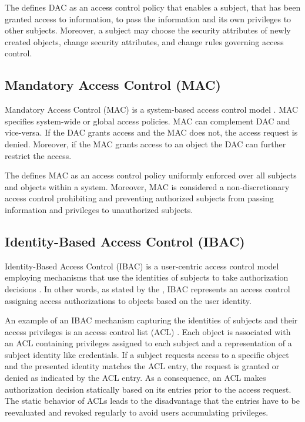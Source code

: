 The \citeauthor{JTF2020} \cite{JTF2020} defines DAC as an access control policy that enables a subject, that has been granted access to information, to pass the information and its own privileges to other subjects.
Moreover, a subject may choose the security attributes of newly created objects, change security attributes, and change rules governing access control.

\subsection{Mandatory Access Control (MAC)}
Mandatory Access Control (MAC) is a system-based access control model \cite{Eckert2023}.
MAC specifies system-wide or global access policies.
MAC can complement DAC and vice-versa.
If the DAC grants access and the MAC does not, the access request is denied.
Moreover, if the MAC grants access to an object the DAC can further restrict the access.

The \citeauthor{JTF2020} \cite{JTF2020} defines MAC as an access control policy uniformly enforced over all subjects and objects within a system.
Moreover, MAC is considered a non-discretionary access control prohibiting and preventing authorized subjects from passing information and privileges to unauthorized subjects.

\subsection{Identity-Based Access Control (IBAC)}
Identity-Based Access Control (IBAC) is a user-centric access control model employing mechanisms that use the identities of subjects to take authorization decisions \cite{Hu2014}.
In other words, as stated by the \citeauthor{CNSS2022} \cite{CNSS2022}, IBAC represents an access control assigning access authorizations to objects based on the user identity.

An example of an IBAC mechanism capturing the identities of subjects and their access privileges is an access control list (ACL) \cite{Hu2014}.
Each object is associated with an ACL containing privileges assigned to each subject and a representation of a subject identity like credentials.
If a subject requests access to a specific object and the presented identity matches the ACL entry, the request is granted or denied as indicated by the ACL entry.
As a consequence, an ACL makes authorization decision statically based on its entries prior to the access request.
The static behavior of ACLs leads to the disadvantage that the entries have to be reevaluated and revoked regularly to avoid users accumulating privileges.

